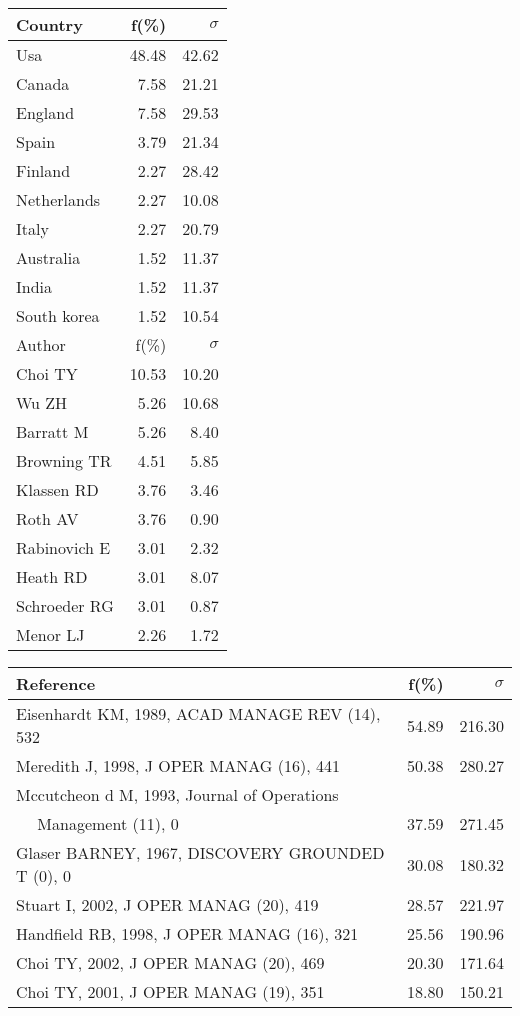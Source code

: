 \documentclass[a4paper,11pt]{report}
\begin{document}
\begin{landscape}
\begin{table}[!ht]
{\begin{tabular}{|l r r|}
\hline
\hline
Country & f(\%) & $\sigma$\\
\hline
Usa & 48.48 & 42.62\\
Canada & 7.58 & 21.21\\
England & 7.58 & 29.53\\
Spain & 3.79 & 21.34\\
Finland & 2.27 & 28.42\\
Netherlands & 2.27 & 10.08\\
Italy & 2.27 & 20.79\\
Australia & 1.52 & 11.37\\
India & 1.52 & 11.37\\
South korea & 1.52 & 10.54\\
\hline
\hline
Author & f(\%) & $\sigma$\\
\hline
Choi TY & 10.53 & 10.20\\
Wu ZH & 5.26 & 10.68\\
Barratt M & 5.26 & 8.40\\
Browning TR & 4.51 & 5.85\\
Klassen RD & 3.76 & 3.46\\
Roth AV & 3.76 & 0.90\\
Rabinovich E & 3.01 & 2.32\\
Heath RD & 3.01 & 8.07\\
Schroeder RG & 3.01 & 0.87\\
Menor LJ & 2.26 & 1.72\\
\hline
\end{tabular}
}
{\scriptsize\begin{tabular}{|l r r|}
\hline
Reference & f(\%) & $\sigma$\\
\hline
Eisenhardt KM, 1989, ACAD MANAGE REV (14), 532 & 54.89 & 216.30\\
Meredith J, 1998, J OPER MANAG (16), 441 & 50.38 & 280.27\\
Mccutcheon d M, 1993, Journal of Operations &  & \\
$\quad$ Management (11), 0 & 37.59 & 271.45\\
Glaser BARNEY, 1967, DISCOVERY GROUNDED T (0), 0 & 30.08 & 180.32\\
Stuart I, 2002, J OPER MANAG (20), 419 & 28.57 & 221.97\\
Handfield RB, 1998, J OPER MANAG (16), 321 & 25.56 & 190.96\\
Choi TY, 2002, J OPER MANAG (20), 469 & 20.30 & 171.64\\
Choi TY, 2001, J OPER MANAG (19), 351 & 18.80 & 150.21\\

\end{tabular}}
\end{table}
\end{landscape}
\end{document}

